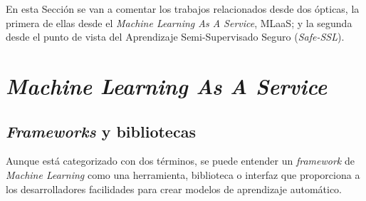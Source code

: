 
En esta Sección se van a comentar los trabajos relacionados desde dos ópticas, la primera de ellas desde el \textit{Machine Learning As A Service}, MLaaS; y la segunda desde el punto de vista del Aprendizaje Semi-Supervisado Seguro (\textit{Safe-SSL}).

\section{\textit{Machine Learning As A Service}}
\subsection{\textit{Frameworks} y bibliotecas}\label{related:frameworks}
Aunque está categorizado con dos términos, se puede entender un \textit{framework} de \textit{Machine Learning} como una herramienta, biblioteca o interfaz que proporciona a los desarrolladores facilidades para crear modelos de aprendizaje automático.


